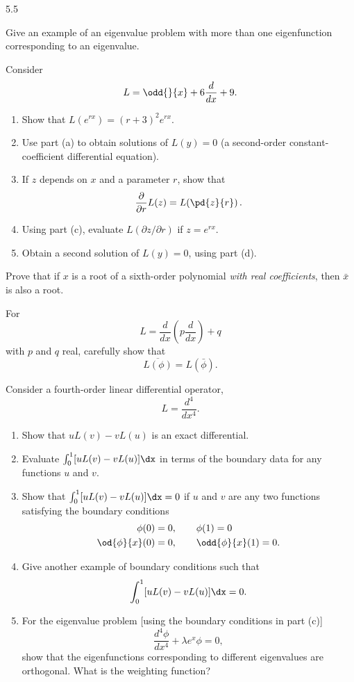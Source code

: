 \begin{exercises}{5.5}
\item Give an example of an eigenvalue problem with more than one eigenfunction corresponding to an eigenvalue.

\item Consider
\[
L = \odd{}{x} + 6\frac{d}{d x} + 9.
\]
\begin{enumerate}
\item Show that $L(e^{rx}) = (r+3)^2e^{rx}$.
\item Use part (a) to obtain solutions of $L(y) = 0$ (a second-order constant-coefficient differential equation).
\item If $z$ depends on $x$ and a parameter $r$, show that
\[
\frac{\partial}{\partial r}L(z) = L\!\left(\pd{z}{r}\right).
\]
\item Using part (c), evaluate $L(\partial z/\partial r)$ if $z = e^{rx}$.
\item Obtain a second solution of $L(y) = 0$, using part (d).
\end{enumerate}

\item Prove that if $x$ is a root of a sixth-order polynomial \textit{with real coefficients}, then $\bar{x}$ is also a root.

\item For
\[
L = \frac{d}{d x}\left(p\frac{d}{d x}\right) + q
\]
with $p$ and $q$ real, carefully show that
\[
\overline{L(\phi)} = L(\bar{\phi}).
\]

\item Consider a fourth-order linear differential operator,
\[
L = \frac{d^4}{dx^4}.
\]
\begin{enumerate}
\item Show that $uL(v) - vL(u)$ is an exact differential.
\item Evaluate $\int_0^1 [uL(v) - vL(u)]\dx$ in terms of the boundary data for any functions $u$ and $v$.
\item Show that $\int_0^1 [uL(v) - vL(u)]\dx = 0$ if $u$ and $v$ are any two functions satisfying the boundary conditions
\begin{align*}
\phi(0) &= 0, \qquad \phi(1) = 0 \\
\od{\phi}{x}(0) &= 0, \qquad \odd{\phi}{x}(1) = 0.
\end{align*}
\item Give another example of boundary conditions such that
\[
\int_0^1 [uL(v) - vL(u)]\dx = 0.
\]
\item For the eigenvalue problem [using the boundary conditions in part (c)]
\[
\frac{d^4\phi}{dx^4} + \lambda e^x\phi = 0,
\]
show that the eigenfunctions corresponding to different eigenvalues are orthogonal.  What is the weighting function?
\end{enumerate}


\end{exercises}
